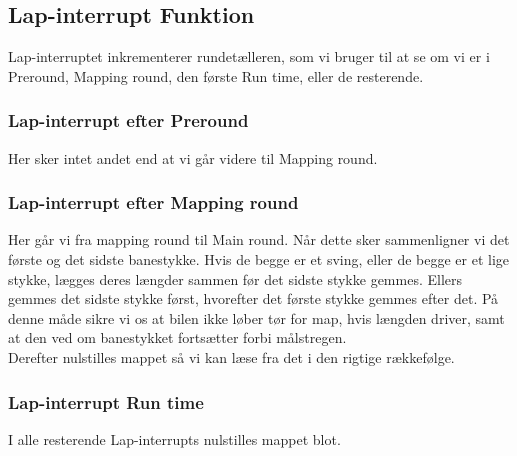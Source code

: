 \subsection{Lap-interrupt Funktion}

Lap-interruptet inkrementerer rundetælleren, som vi bruger til at se om vi er i Preround, Mapping round, den første Run time, eller de resterende.



\subsubsection{Lap-interrupt efter Preround}

Her sker intet andet end at vi går videre til Mapping round.

\subsubsection{Lap-interrupt efter Mapping round}

Her går vi fra mapping round til Main round. Når dette sker sammenligner vi det første og det sidste banestykke. Hvis de begge er et sving, eller de begge er et lige stykke, lægges deres længder sammen før det sidste stykke gemmes. Ellers gemmes det sidste stykke først, hvorefter det første stykke gemmes efter det. På denne måde sikre vi os at bilen ikke løber tør for map, hvis længden driver, samt at den ved om banestykket fortsætter forbi målstregen.
\\
Derefter nulstilles mappet så vi kan læse fra det i den rigtige rækkefølge.

\subsubsection{Lap-interrupt Run time}

I alle resterende Lap-interrupts nulstilles mappet blot.

